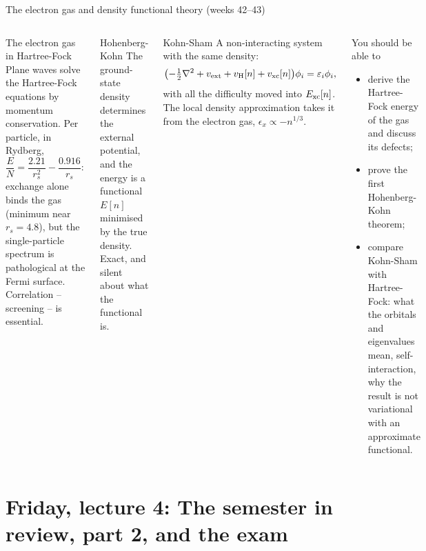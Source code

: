 \documentclass[aspectratio=169,10pt]{beamer}
\begin{document}
\begin{frame}[shrink=7]{The electron gas and density functional theory (weeks 42--43)}
\small
\begin{columns}[T]
\begin{block}{The electron gas in Hartree-Fock}
Plane waves solve the Hartree-Fock equations by momentum conservation. Per particle, in Rydberg,
\[
 \frac EN=\frac{2.21}{r_s^2}-\frac{0.916}{r_s}:
\]
exchange alone binds the gas (minimum near $r_s=4.8$), but the single-particle spectrum is pathological at the Fermi surface. Correlation -- screening -- is essential.
\end{block}
\begin{block}{Hohenberg-Kohn}
The ground-state density determines the external potential, and the energy is a functional $E[n]$ minimised by the true density. Exact, and silent about what the functional is.
\end{block}
\begin{block}{Kohn-Sham}
A non-interacting system with the same density:
\[
 \bigl(-\tfrac12\nabla^2+v_{\rm ext}+v_{\rm H}[n]+v_{\rm xc}[n]\bigr)\phi_i=\varepsilon_i\phi_i,
\]
with all the difficulty moved into $E_{\rm xc}[n]$. The local density approximation takes it from the electron gas, $\epsilon_x\propto-n^{1/3}$.
\end{block}
\begin{block}{You should be able to}
\begin{itemize}
\item derive the Hartree-Fock energy of the gas and discuss its defects;
\item prove the first Hohenberg-Kohn theorem;
\item compare Kohn-Sham with Hartree-Fock: what the orbitals and eigenvalues mean, self-interaction, why the result is not variational with an approximate functional.
\end{itemize}
\end{block}
\end{columns}
\end{frame}

\section[Friday 4: Review, part 2; the exam]{Friday, lecture 4: The semester in review, part 2, and the exam}
\end{document}
